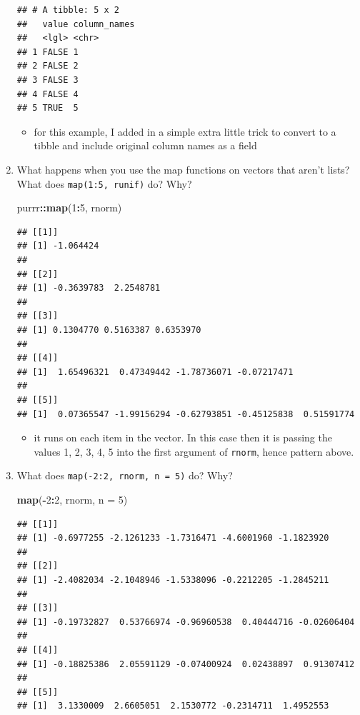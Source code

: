 \documentclass[]{book}
\newenvironment{Shaded}{\begin{snugshade}}{\end{snugshade}}
\newcommand{\DataTypeTok}[1]{\textcolor[rgb]{0.13,0.29,0.53}{#1}}
\newcommand{\DecValTok}[1]{\textcolor[rgb]{0.00,0.00,0.81}{#1}}
\newcommand{\KeywordTok}[1]{\textcolor[rgb]{0.13,0.29,0.53}{\textbf{#1}}}
\newcommand{\NormalTok}[1]{#1}
\newcommand{\OperatorTok}[1]{\textcolor[rgb]{0.81,0.36,0.00}{\textbf{#1}}}
\providecommand{\tightlist}{%
  \setlength{\itemsep}{0pt}\setlength{\parskip}{0pt}}
\theoremstyle{definition}
\theoremstyle{definition}
\theoremstyle{definition}
\theoremstyle{remark}
\begin{document}
\begin{enumerate}
\begin{verbatim}
## # A tibble: 5 x 2
##   value column_names
##   <lgl> <chr>       
## 1 FALSE 1           
## 2 FALSE 2           
## 3 FALSE 3           
## 4 FALSE 4           
## 5 TRUE  5
\end{verbatim}

  \begin{itemize}
  \tightlist
  \item
    for this example, I added in a simple extra little trick to convert
    to a tibble and include original column names as a field
  \end{itemize}
\item
  What happens when you use the map functions on vectors that aren't
  lists? What does \texttt{map(1:5,\ runif)} do? Why?

\begin{Shaded}
\begin{Highlighting}[]
\NormalTok{purrr}\OperatorTok{::}\KeywordTok{map}\NormalTok{(}\DecValTok{1}\OperatorTok{:}\DecValTok{5}\NormalTok{, rnorm)}
\end{Highlighting}
\end{Shaded}

\begin{verbatim}
## [[1]]
## [1] -1.064424
## 
## [[2]]
## [1] -0.3639783  2.2548781
## 
## [[3]]
## [1] 0.1304770 0.5163387 0.6353970
## 
## [[4]]
## [1]  1.65496321  0.47349442 -1.78736071 -0.07217471
## 
## [[5]]
## [1]  0.07365547 -1.99156294 -0.62793851 -0.45125838  0.51591774
\end{verbatim}

  \begin{itemize}
  \tightlist
  \item
    it runs on each item in the vector. In this case then it is passing
    the values 1, 2, 3, 4, 5 into the first argument of \texttt{rnorm},
    hence pattern above.
  \end{itemize}
\item
  What does \texttt{map(-2:2,\ rnorm,\ n\ =\ 5)} do? Why?

\begin{Shaded}
\begin{Highlighting}[]
\KeywordTok{map}\NormalTok{(}\OperatorTok{-}\DecValTok{2}\OperatorTok{:}\DecValTok{2}\NormalTok{, rnorm, }\DataTypeTok{n =} \DecValTok{5}\NormalTok{)}
\end{Highlighting}
\end{Shaded}

\begin{verbatim}
## [[1]]
## [1] -0.6977255 -2.1261233 -1.7316471 -4.6001960 -1.1823920
## 
## [[2]]
## [1] -2.4082034 -2.1048946 -1.5338096 -0.2212205 -1.2845211
## 
## [[3]]
## [1] -0.19732827  0.53766974 -0.96960538  0.40444716 -0.02606404
## 
## [[4]]
## [1] -0.18825386  2.05591129 -0.07400924  0.02438897  0.91307412
## 
## [[5]]
## [1]  3.1330009  2.6605051  2.1530772 -0.2314711  1.4952553
\end{verbatim}


\end{enumerate}
\end{document}
